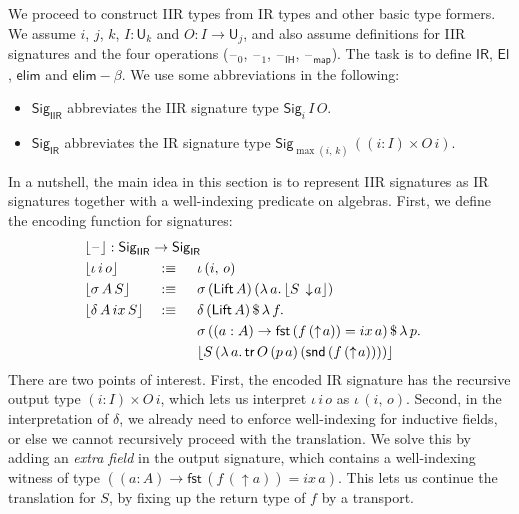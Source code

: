 \documentclass[acmsmall,screen,review,anonymous]{acmart}
\newcommand{\msf}[1]{{\mathsf{#1}}}
\newcommand{\U}{\msf{U}}
\newcommand{\El}{\msf{El}}
\newcommand{\Lift}{\msf{Lift}}
\newcommand{\lup}{\uparrow}
\newcommand{\ldown}{\downarrow}
\newcommand{\Sig}{\msf{Sig}}
\newcommand{\blank}{{\mathord{\hspace{1pt}\text{--}\hspace{1pt}}}}
\newcommand{\ix}{{ix}}
\newcommand{\IR}{\msf{IR}}
\newcommand{\IH}{\msf{IH}}
\newcommand{\map}{\msf{map}}
\newcommand{\elim}{\msf{elim}}
\newcommand{\tr}{\msf{tr}}
\newcommand{\fst}{\msf{fst}}
\newcommand{\snd}{\msf{snd}}
\newcommand{\IIR}{\msf{IIR}}
\newcommand{\Sigr}[1]{\lfloor #1 \rfloor}
\begin{document}

We proceed to construct IIR types from IR types and other basic type formers. We assume $i$, $j$,
$k$, $I : \U_k$ and $O : I \to \U_j$, and also assume definitions for IIR signatures and the four
operations ($\blank_0$, $\blank_1$, $\blank_\IH$, $\blank_\map$). The task is to define $\IR$,
$\El$, $\elim$ and $\elim\!-\!\!\beta$. We use some abbreviations in the following:
\begin{itemize}
\item $\Sig_\IIR$ abbreviates the IIR signature type $\Sig_i\,I\,O$.
\item $\Sig_\IR$ abbreviates the IR signature type $\Sig_{\max(i,\,k)}\,((i : I) \times O\,i)$.
\end{itemize}
In a nutshell, the main idea in this section is to represent IIR signatures as IR signatures together
with a well-indexing predicate on algebras. First, we define the encoding function for signatures:
\begin{alignat*}{4}
  & \rlap{$\Sigr{\blank} : \Sig_\IIR \to \Sig_\IR$}\\
  & \Sigr{\iota\,i\,o}       &&:\equiv \hspace{0.5em} &&\iota\,(i,\,o)\\
  & \Sigr{\sigma\,A\,S}      &&:\equiv \hspace{0.5em} &&\sigma\,(\Lift\,A)\,(\lambda\,a.\,\Sigr{S\,\ldown\!a})\\
  & \Sigr{\delta\,A\,\ix\,S} &&:\equiv \hspace{0.5em} &&\delta\,(\Lift\,A)\,\$\,\lambda\,f.\\
  &  &&                                &&\sigma\,((a : A) \to \fst\,(f\,(\lup\!a)) = \ix\,a)\,\$\,\lambda\,p.\\
  &  &&                                &&\Sigr{S\,(\lambda\,a.\,\tr\,O\,(p\,a)\,(\snd\,(f\,(\lup\! a))))}
\end{alignat*}
There are two points of interest. First, the encoded IR signature has the recursive output type $(i
: I) \times O\,i$, which lets us interpret $\iota\,i\,o$ as $\iota\,(i,\,o)$. Second, in the
interpretation of $\delta$, we already need to enforce well-indexing for inductive fields, or else
we cannot recursively proceed with the translation. We solve this by adding an \emph{extra field} in
the output signature, which contains a well-indexing witness of type $((a : A) \to \fst\,(f\,(\lup\!a)) = \ix\,a)$.
This lets us continue the translation for $S$, by fixing up the return type of $f$ by a transport.
\end{document}
